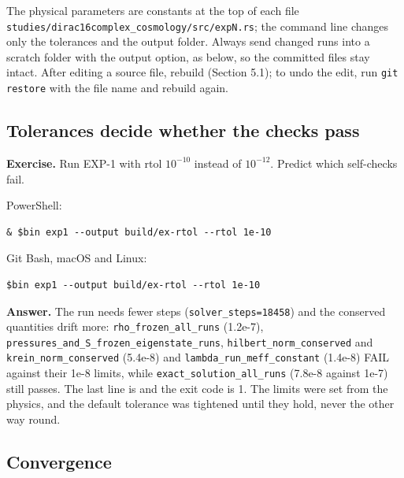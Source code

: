 \documentclass[11pt]{article}
\begin{document}
The physical parameters are constants at the top of each file \texttt{studies/\allowbreak{}dirac16c\allowbreak{}omplex\_c\allowbreak{}osmology\allowbreak{}/src/exp\allowbreak{}N.rs}; the command line changes only the tolerances and the output folder. Always send changed runs into a scratch folder with the output option, as below, so the committed files stay intact. After editing a source file, rebuild (Section 5.1); to undo the edit, run \texttt{git rest\allowbreak{}ore} with the file name and rebuild again.

\subsection{Tolerances decide whether the checks pass}

\textbf{Exercise.} Run EXP-1 with rtol $10^{-10}$ instead of $10^{-12}$. Predict which self-checks fail.

PowerShell:

\begin{Verbatim}[fontsize=\small]
& $bin exp1 --output build/ex-rtol --rtol 1e-10
\end{Verbatim}

Git Bash, macOS and Linux:

\begin{Verbatim}[fontsize=\small]
$bin exp1 --output build/ex-rtol --rtol 1e-10
\end{Verbatim}

\textbf{Answer.} The run needs fewer steps (\texttt{solver\_s\allowbreak{}teps=184\allowbreak{}58}) and the conserved quantities drift more: \texttt{rho\_froz\allowbreak{}en\_all\_r\allowbreak{}uns} (1.2e-7), \texttt{pressure\allowbreak{}s\_and\_S\_\allowbreak{}frozen\_e\allowbreak{}igenstat\allowbreak{}e\_runs}, \texttt{hilbert\_\allowbreak{}norm\_con\allowbreak{}served} and \texttt{krein\_no\allowbreak{}rm\_conse\allowbreak{}rved} (5.4e-8) and \texttt{lambda\_r\allowbreak{}un\_meff\_\allowbreak{}constant} (1.4e-8) FAIL against their 1e-8 limits, while \texttt{exact\_so\allowbreak{}lution\_a\allowbreak{}ll\_runs} (7.8e-8 against 1e-7) still passes. The last line is \texttt{} and the exit code is 1. The limits were set from the physics, and the default tolerance was tightened until they hold, never the other way round.

\subsection{Convergence}
\end{document}
